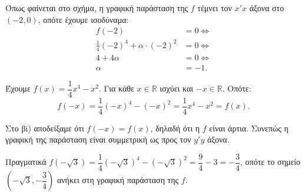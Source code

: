 \begin{alist}
\item Όπως φαίνεται στο σχήμα, η γραφική παράσταση της $f$ τέμνει τον $x'x$ άξονα στο $(-2,0)$, οπότε έχουμε ισοδύναμα:
\begin{align*}
f(-2) &= 0 \Leftrightarrow \\
\frac{1}{4}(-2)^4 + \alpha\cdot(-2)^2 &= 0 \Leftrightarrow \\
4 + 4\alpha &= 0 \Leftrightarrow \\
\alpha &= -1.
\end{align*}
\item 
\begin{rlist}
\item Έχουμε $f(x) = \dfrac{1}{4}x^4 - x^2$. Για κάθε $x \in \mathbb{R}$ ισχύει και $-x \in \mathbb{R}$. Οπότε:
\[f(-x) = \frac{1}{4}(-x)^4 - (-x)^2 = \frac{1}{4}x^4 - x^2 = f(x).\]
\item Στο βi) αποδείξαμε ότι $f(-x) = f(x)$, δηλαδή ότι η $f$ είναι άρτια. Συνεπώς η γραφική της παράσταση είναι συμμετρική ως προς τον $y'y$ άξονα.
\end{rlist}
\item Πραγματικά $f(-\sqrt{3}) = \dfrac{1}{4}(-\sqrt{3})^4 - (-\sqrt{3})^2 = \dfrac{9}{4} - 3 = -\dfrac{3}{4}$, οπότε το σημείο $\left(-\sqrt{3}, -\dfrac{3}{4}\right)$ ανήκει στη γραφική παράσταση της $f$.
\end{alist}
\begin{center}
\end{center}

